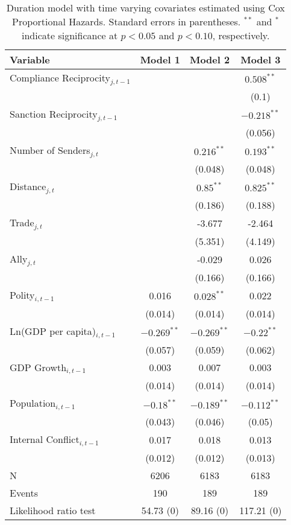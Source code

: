 \begin{table}[ht]
\centering
{\normalsize
\begin{tabular}{lccc}
 Variable & Model 1 & Model 2 & Model 3 \\ 
  \hline
\hline
Compliance Reciprocity$_{j,t-1}$ &  &  & $0.508^{\ast\ast}$ \\ 
   &  &  & (0.1) \\ 
  Sanction Reciprocity$_{j,t-1}$ &  &  & $-0.218^{\ast\ast}$ \\ 
   &  &  & (0.056) \\ 
   \hline
Number of Senders$_{j,t}$ &  & $0.216^{\ast\ast}$ & $0.193^{\ast\ast}$ \\ 
   &  & (0.048) & (0.048) \\ 
  Distance$_{j,t}$ &  & $0.85^{\ast\ast}$ & $0.825^{\ast\ast}$ \\ 
   &  & (0.186) & (0.188) \\ 
  Trade$_{j,t}$ &  & -3.677 & -2.464 \\ 
   &  & (5.351) & (4.149) \\ 
  Ally$_{j,t}$ &  & -0.029 & 0.026 \\ 
   &  & (0.166) & (0.166) \\ 
   \hline
Polity$_{i,t-1}$ & 0.016 & $0.028^{\ast\ast}$ & 0.022 \\ 
   & (0.014) & (0.014) & (0.014) \\ 
  Ln(GDP per capita)$_{i,t-1}$ & $-0.269^{\ast\ast}$ & $-0.269^{\ast\ast}$ & $-0.22^{\ast\ast}$ \\ 
   & (0.057) & (0.059) & (0.062) \\ 
  GDP Growth$_{i,t-1}$ & 0.003 & 0.007 & 0.003 \\ 
   & (0.014) & (0.014) & (0.014) \\ 
  Population$_{i,t-1}$ & $-0.18^{\ast\ast}$ & $-0.189^{\ast\ast}$ & $-0.112^{\ast\ast}$ \\ 
   & (0.043) & (0.046) & (0.05) \\ 
  Internal Conflict$_{i,t-1}$ & 0.017 & 0.018 & 0.013 \\ 
   & (0.012) & (0.012) & (0.013) \\ 
   \hline
N & 6206 & 6183 & 6183 \\ 
  Events & 190 & 189 & 189 \\ 
  Likelihood ratio test & 54.73 (0) & 89.16 (0) & 117.21 (0) \\ 
   \hline
\hline
\end{tabular}
}
\caption{Duration model with time varying covariates estimated using Cox Proportional Hazards. Standard errors in parentheses. $^{**}$ and $^{*}$ indicate significance at $p< 0.05 $ and $p< 0.10 $, respectively.} 
\label{tab:regResults}
\end{table}

